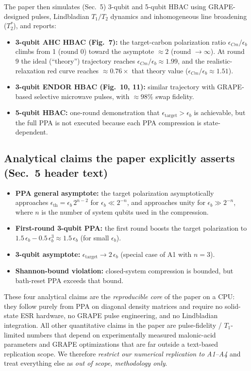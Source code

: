 \documentclass[11pt]{article}
\begin{document}
The paper then simulates (Sec.~5) 3-qubit and 5-qubit HBAC using
GRAPE-designed pulses, Lindbladian $T_1/T_2$ dynamics and inhomogeneous line
broadening ($T_2^{*}$), and reports:
\begin{itemize}
  \item \textbf{3-qubit AHC HBAC (Fig.~7):} the target-carbon polarization ratio
    $\epsilon_{Cm}/\epsilon_b$ climbs from 1 (round 0) toward the asymptote
    $\approx 2$ (round $\to \infty$). At round 9 the ideal (``theory'')
    trajectory reaches $\epsilon_{Cm}/\epsilon_b \approx 1.99$, and the
    realistic-relaxation red curve reaches $\approx 0.76\times$ that theory
    value ($\epsilon_{Cm}/\epsilon_b \approx 1.51$).
  \item \textbf{3-qubit ENDOR HBAC (Fig.~10, 11):} similar trajectory with
    GRAPE-based selective microwave pulses, with $\approx 98\%$ swap fidelity.
  \item \textbf{5-qubit HBAC:} one-round demonstration that
    $\epsilon_{\text{target}} > \epsilon_b$ is achievable, but the full PPA is
    not executed because each PPA compression is state-dependent.
\end{itemize}

\subsection*{Analytical claims the paper explicitly asserts (Sec.~5 header text)}
\begin{itemize}
  \item[\textbf{A1}] \textbf{PPA general asymptote:} the target polarization
    asymptotically approaches
    $\epsilon_{\text{th}} = \epsilon_b\, 2^{n-2}$ for
    $\epsilon_b \ll 2^{-n}$, and approaches unity for
    $\epsilon_b \gg 2^{-n}$, where $n$ is the number of system qubits used in
    the compression.
  \item[\textbf{A2}] \textbf{First-round 3-qubit PPA:} the first round boosts
    the target polarization to
    $1.5\,\epsilon_b - 0.5\,\epsilon_b^{3} \approx 1.5\,\epsilon_b$
    (for small $\epsilon_b$).
  \item[\textbf{A3}] \textbf{3-qubit asymptote:} $\epsilon_{\text{target}} \to
    2\,\epsilon_b$ (special case of A1 with $n=3$).
  \item[\textbf{A4}] \textbf{Shannon-bound violation:} closed-system compression
    is bounded, but bath-reset PPA exceeds that bound.
\end{itemize}

These four analytical claims are the \emph{reproducible core} of the paper on
a CPU: they follow purely from PPA on diagonal density matrices and require no
solid-state ESR hardware, no GRAPE pulse engineering, and no Lindbladian
integration. All other quantitative claims in the paper are pulse-fidelity /
$T_1$-limited numbers that depend on experimentally measured malonic-acid
parameters and GRAPE optimizations that are far outside a text-based
replication scope. We therefore \emph{restrict our numerical replication to
A1--A4} and treat everything else as \emph{out of scope, methodology only}.
\end{document}
